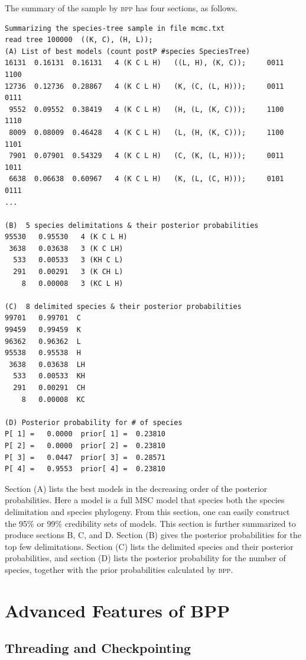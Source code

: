 \documentclass{book}
\numberwithin{equation}{section} \renewcommand{\baselinestretch}{0.55}
\begin{document}
The summary of the sample by \textsc{bpp} has four sections, as
follows.
\begin{verbatim}
Summarizing the species-tree sample in file mcmc.txt
read tree 100000  ((K, C), (H, L));
(A) List of best models (count postP #species SpeciesTree)
16131  0.16131  0.16131   4 (K C L H)   ((L, H), (K, C));     0011 1100
12736  0.12736  0.28867   4 (K C L H)   (K, (C, (L, H)));     0011 0111
 9552  0.09552  0.38419   4 (K C L H)   (H, (L, (K, C)));     1100 1110
 8009  0.08009  0.46428   4 (K C L H)   (L, (H, (K, C)));     1100 1101
 7901  0.07901  0.54329   4 (K C L H)   (C, (K, (L, H)));     0011 1011
 6638  0.06638  0.60967   4 (K C L H)   (K, (L, (C, H)));     0101 0111
...

(B)  5 species delimitations & their posterior probabilities
95530   0.95530   4 (K C L H)
 3638   0.03638   3 (K C LH)
  533   0.00533   3 (KH C L)
  291   0.00291   3 (K CH L)
    8   0.00008   3 (KC L H)

(C)  8 delimited species & their posterior probabilities
99701   0.99701  C
99459   0.99459  K
96362   0.96362  L
95538   0.95538  H
 3638   0.03638  LH
  533   0.00533  KH
  291   0.00291  CH
    8   0.00008  KC

(D) Posterior probability for # of species
P[ 1] =   0.0000  prior[ 1] =  0.23810
P[ 2] =   0.0000  prior[ 2] =  0.23810
P[ 3] =   0.0447  prior[ 3] =  0.28571
P[ 4] =   0.9553  prior[ 4] =  0.23810
\end{verbatim}

Section (A) lists the best models in the decreasing order of the
posterior probabilities.  Here a model is a full MSC model that
species both the species delimitation and species phylogeny.  From
this section, one can easily construct the 95\% or 99\% credibility
sets of models.  This section is further summarized to produce
sections B, C, and D.  Section (B) gives the posterior probabilities
for the top few delimitations.  Section (C) lists the delimited
species and their posterior probabilities, and section (D) lists the
posterior probability for the number of species, together with the
prior probabilities calculated by \textsc{bpp}.


\chapter{Advanced Features of BPP}
\section{Threading and Checkpointing}
\end{document}
